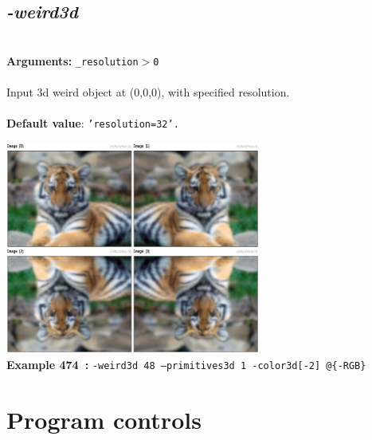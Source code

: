 \documentclass[a4paper,11pt,twoside]{book}
\begin{document}
\subsection{\emph{-weird3d} }\vspace*{-0.5em}
~\\\textbf{Arguments: } 
{\small \texttt{\_resolution$>$0}}\\~\\
Input 3d weird object at (0,0,0), with specified resolution.
~\\~\\\textbf{Default value}: {\small \texttt{'resolution=32'.}}
\begin{center}\includegraphics[keepaspectratio=true,height=7cm,width=\textwidth]{img/gmic_def474.jpg}\\
{\footnotesize \textbf{Example 474~:} \texttt{-weird3d 48 --primitives3d 1 -color3d[-2] @\{-RGB\}}}
\end{center}
\section{Program controls}
\end{document}
